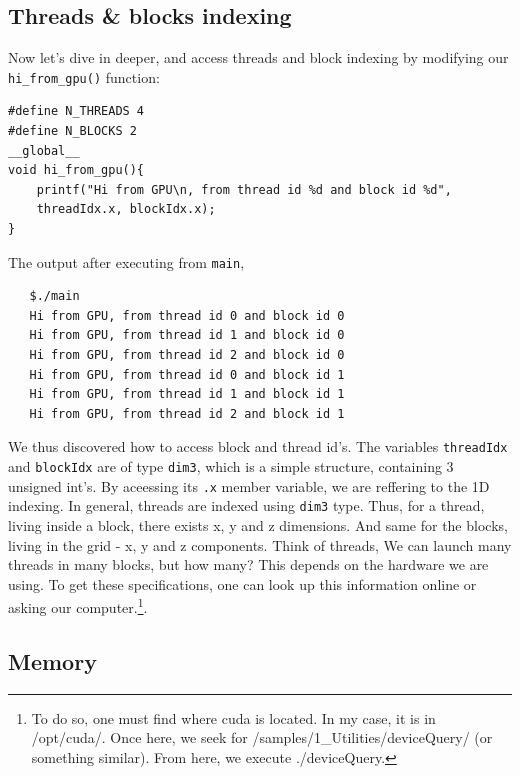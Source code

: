 \subsection{Threads \& blocks indexing}
Now let's dive in deeper, and access threads and block indexing by modifying our 
\verb|hi_from_gpu()| function:
\vspace{-0.5cm}
\begin{verbatim}
#define N_THREADS 4
#define N_BLOCKS 2
__global__ 
void hi_from_gpu(){
    printf("Hi from GPU\n, from thread id %d and block id %d", 
    threadIdx.x, blockIdx.x);
}
\end{verbatim}
The output after executing from \verb|main|,
\vspace{-0.5cm}
\begin{verbatim}
   $./main
   Hi from GPU, from thread id 0 and block id 0 
   Hi from GPU, from thread id 1 and block id 0 
   Hi from GPU, from thread id 2 and block id 0 
   Hi from GPU, from thread id 0 and block id 1 
   Hi from GPU, from thread id 1 and block id 1 
   Hi from GPU, from thread id 2 and block id 1 
\end{verbatim}
\vspace{-0.5cm}
We thus discovered how to access block and thread id's. The 
variables \verb|threadIdx| and \verb|blockIdx| are of type \verb|dim3|,
which is a simple structure, containing 3 unsigned int's. By aceessing 
its \verb|.x| member variable, we are reffering to the 1D indexing. In general, 
threads are indexed using \verb|dim3| type. Thus, for a thread, living inside a block, there exists x, y and z 
dimensions. And same for the blocks, living in the grid - x, y and z components. 
Think of threads, 
We can launch many threads in many blocks, but how many? This depends on 
the hardware we are using.
To get these specifications, one can look up this information online or asking our computer.\footnote{
To do so, one must find where {\selectfont cuda} is located. In my case, it is in 
{\selectfont /opt/cuda/}.
Once here, we seek for {\selectfont /samples/1\_Utilities/deviceQuery/} 
(or something similar). 
From here, we execute {\selectfont ./deviceQuery}.   
}.

\subsection{Memory}

